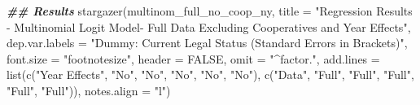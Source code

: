 \documentclass[a4paper,nobind]{templates/ociamthesis}
\newenvironment{Shaded}{\begin{snugshade}}{\end{snugshade}}
\newcommand{\AttributeTok}[1]{\textcolor[rgb]{0.77,0.63,0.00}{#1}}
\newcommand{\ConstantTok}[1]{\textcolor[rgb]{0.00,0.00,0.00}{#1}}
\newcommand{\DocumentationTok}[1]{\textcolor[rgb]{0.56,0.35,0.01}{\textbf{\textit{#1}}}}
\newcommand{\FunctionTok}[1]{\textcolor[rgb]{0.00,0.00,0.00}{#1}}
\newcommand{\NormalTok}[1]{#1}
\newcommand{\StringTok}[1]{\textcolor[rgb]{0.31,0.60,0.02}{#1}}
\renewenvironment{Shaded}
{
  \vspace{10pt}%
  \begin{snugshade}%
}{%
  \end{snugshade}%
  \vspace{8pt}%
}
\begin{document}
\begin{Shaded}
\begin{Highlighting}[]
\DocumentationTok{\#\# Results }
\FunctionTok{stargazer}\NormalTok{(multinom\_full\_no\_coop\_ny, }\AttributeTok{title =} \StringTok{"Regression Results {-} Multinomial Logit Model{-} Full Data Excluding Cooperatives and Year Effects"}\NormalTok{, }\AttributeTok{dep.var.labels =} \StringTok{"Dummy: Current Legal Status (Standard Errors in Brackets)"}\NormalTok{, }\AttributeTok{font.size =} \StringTok{"footnotesize"}\NormalTok{, }\AttributeTok{header =} \ConstantTok{FALSE}\NormalTok{, }\AttributeTok{omit =} \StringTok{"\^{}factor."}\NormalTok{, }\AttributeTok{add.lines =} \FunctionTok{list}\NormalTok{(}\FunctionTok{c}\NormalTok{(}\StringTok{"Year Effects"}\NormalTok{, }\StringTok{"No"}\NormalTok{, }\StringTok{"No"}\NormalTok{, }\StringTok{"No"}\NormalTok{, }\StringTok{"No"}\NormalTok{, }\StringTok{"No"}\NormalTok{), }\FunctionTok{c}\NormalTok{(}\StringTok{"Data"}\NormalTok{, }\StringTok{"Full"}\NormalTok{, }\StringTok{"Full"}\NormalTok{, }\StringTok{"Full"}\NormalTok{, }\StringTok{"Full"}\NormalTok{, }\StringTok{"Full"}\NormalTok{)), }\AttributeTok{notes.align =} \StringTok{"l"}\NormalTok{)}
\end{Highlighting}
\end{Shaded}
\end{document}
